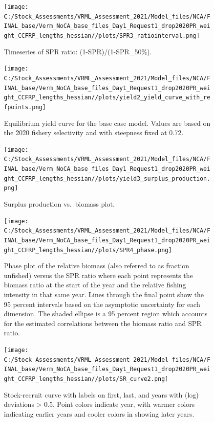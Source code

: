 \documentclass[11pt,
  english,
]{article}
\begin{document}
\FloatBarrier

\begin{figure}
\centering
\texttt{[image: C:/Stock\_Assessments/VRML\_Assessment\_2021/Model\_files/NCA/FINAL\_base/Verm\_NoCA\_base\_files\_Day1\_Request1\_drop2020PR\_weight\_CCFRP\_lengths\_hessian//plots/SPR3\_ratiointerval.png]}
\caption{Timeseries of SPR ratio: (1-SPR)/(1-SPR\_50\%).\label{fig:1-spr}}
\end{figure}

\begin{figure}
\centering
\texttt{[image: C:/Stock\_Assessments/VRML\_Assessment\_2021/Model\_files/NCA/FINAL\_base/Verm\_NoCA\_base\_files\_Day1\_Request1\_drop2020PR\_weight\_CCFRP\_lengths\_hessian//plots/yield2\_yield\_curve\_with\_refpoints.png]}
\caption{Equilibrium yield curve for the base case model. Values are based on the 2020 fishery selectivity and with steepness fixed at 0.72.\label{fig:yield2}}
\end{figure}

\begin{figure}
\centering
\texttt{[image: C:/Stock\_Assessments/VRML\_Assessment\_2021/Model\_files/NCA/FINAL\_base/Verm\_NoCA\_base\_files\_Day1\_Request1\_drop2020PR\_weight\_CCFRP\_lengths\_hessian//plots/yield3\_surplus\_production.png]}
\caption{Surplus production vs.~biomass plot.\label{fig:yield3}}
\end{figure}

\FloatBarrier

\begin{figure}
\centering
\texttt{[image: C:/Stock\_Assessments/VRML\_Assessment\_2021/Model\_files/NCA/FINAL\_base/Verm\_NoCA\_base\_files\_Day1\_Request1\_drop2020PR\_weight\_CCFRP\_lengths\_hessian//plots/SPR4\_phase.png]}
\caption{Phase plot of the relative biomass (also referred to as fraction unfished) versus the SPR ratio where each point represents the biomass ratio at the start of the year and the relative fishing intensity in that same year. Lines through the final point show the 95 percent intervals based on the asymptotic uncertainty for each dimension. The shaded ellipse is a 95 percent region which accounts for the estimated correlations between the biomass ratio and SPR ratio.\label{fig:phase}}
\end{figure}

\begin{figure}
\centering
\texttt{[image: C:/Stock\_Assessments/VRML\_Assessment\_2021/Model\_files/NCA/FINAL\_base/Verm\_NoCA\_base\_files\_Day1\_Request1\_drop2020PR\_weight\_CCFRP\_lengths\_hessian//plots/SR\_curve2.png]}
\caption{Stock-recruit curve with labels on first, last, and years with (log) deviations \textgreater{} 0.5. Point colors indicate year, with warmer colors indicating earlier years and cooler colors in showing later years.\label{fig:bh-curve}}
\end{figure}
\end{document}
